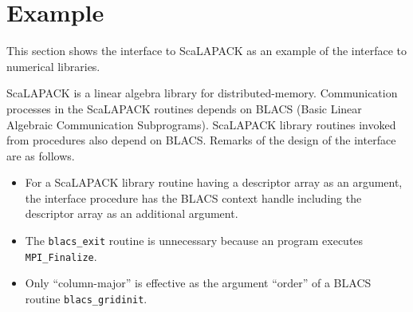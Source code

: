 \section{Example}

   This section shows the interface to ScaLAPACK as an example of the
   {\XMP} interface to numerical libraries.
   
   ScaLAPACK is a linear algebra library for distributed-memory.
   Communication processes in the ScaLAPACK routines depends on BLACS
   (Basic Linear Algebraic Communication Subprograms).
   ScaLAPACK library routines invoked from {\XMP} procedures also depend
   on BLACS. Remarks of the design of the interface are as follows.

\begin{itemize}
\item For a ScaLAPACK library routine having a descriptor array as an
      argument, the interface procedure has the BLACS context handle
      including the descriptor array as an additional argument.
\item The {\tt blacs\_exit} routine is unnecessary because an {\XMP}
      program executes {\tt MPI\_Finalize}.
\item Only ``column-major'' is effective as the argument ``order'' of a
      BLACS routine {\tt blacs\_gridinit}.
\end{itemize}

